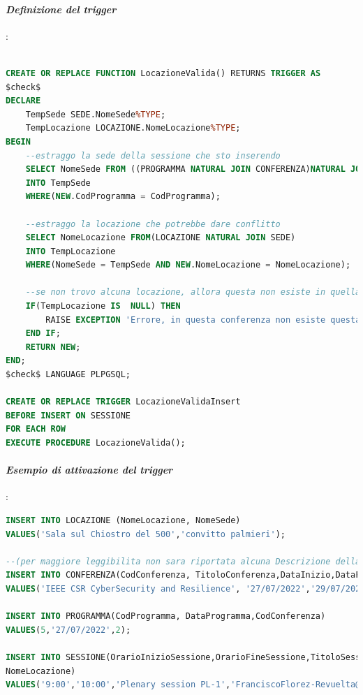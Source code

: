 \documentclass[a4page]{article}
\begin{document}
\paragraph{\textit{Definizione del trigger}}:
\begin{lstlisting}[language=SQL,
        deletekeywords={IDENTITY,INT},
        morekeywords={clustered},    
        framesep=10pt,
        framextopmargin=10pt]

CREATE OR REPLACE FUNCTION LocazioneValida() RETURNS TRIGGER AS
$check$
DECLARE
	TempSede SEDE.NomeSede%TYPE;
	TempLocazione LOCAZIONE.NomeLocazione%TYPE;
BEGIN
	--estraggo la sede della sessione che sto inserendo
	SELECT NomeSede FROM ((PROGRAMMA NATURAL JOIN CONFERENZA)NATURAL JOIN SEDE)
	INTO TempSede		
	WHERE(NEW.CodProgramma = CodProgramma);

	--estraggo la locazione che potrebbe dare conflitto
	SELECT NomeLocazione FROM(LOCAZIONE NATURAL JOIN SEDE) 
	INTO TempLocazione
	WHERE(NomeSede = TempSede AND NEW.NomeLocazione = NomeLocazione);

	--se non trovo alcuna locazione, allora questa non esiste in quella sede
	IF(TempLocazione IS  NULL) THEN		
		RAISE EXCEPTION 'Errore, in questa conferenza non esiste questa locazione';
	END IF;
	RETURN NEW;
END;
$check$ LANGUAGE PLPGSQL;	

CREATE OR REPLACE TRIGGER LocazioneValidaInsert
BEFORE INSERT ON SESSIONE
FOR EACH ROW
EXECUTE PROCEDURE LocazioneValida();        
\end{lstlisting}
\newpage
\paragraph{\textit{Esempio di attivazione del trigger}}:
\begin{lstlisting}[language=SQL,
        deletekeywords={IDENTITY,INT},
        morekeywords={clustered},    
        framesep=10pt,
        framextopmargin=10pt]
INSERT INTO LOCAZIONE (NomeLocazione, NomeSede)
VALUES('Sala sul Chiostro del 500','convitto palmieri');

--(per maggiore leggibilita non sara riportata alcuna Descrizione della conferenza).
INSERT INTO CONFERENZA(CodConferenza, TitoloConferenza,DataInizio,DataFine,Descrizione,NomeSede)
VALUES('IEEE CSR CyberSecurity and Resilience', '27/07/2022','29/07/2022','.','monte sant''angelo');

INSERT INTO PROGRAMMA(CodProgramma, DataProgramma,CodConferenza)
VALUES(5,'27/07/2022',2);

INSERT INTO SESSIONE(OrarioInizioSessione,OrarioFineSessione,TitoloSessione,Chair,CodProgramma,
NomeLocazione)
VALUES('9:00','10:00','Plenary session PL-1','FranciscoFlorez-Revuelta@gmail.com',5,'Sala sul Chiostro del 500 (First floor)');
\end{lstlisting}
\end{document}
